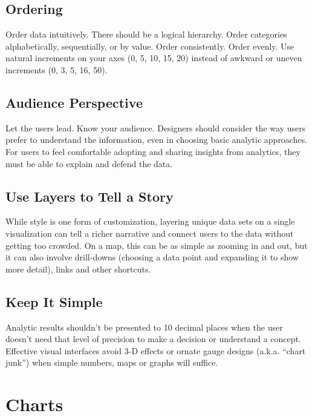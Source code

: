 \documentclass[]{book}
\begin{document}
\subsection{Ordering}\label{ordering}

Order data intuitively. There should be a logical hierarchy. Order
categories alphabetically, sequentially, or by value. Order
consistently. Order evenly. Use natural increments on your axes (0, 5,
10, 15, 20) instead of awkward or uneven increments (0, 3, 5, 16, 50).

\subsection{Audience Perspective}\label{audience-perspective}

Let the users lead. Know your audience. Designers should consider the
way users prefer to understand the information, even in choosing basic
analytic approaches. For users to feel comfortable adopting and sharing
insights from analytics, they must be able to explain and defend the
data.

\subsection{Use Layers to Tell a
Story}\label{use-layers-to-tell-a-story}

While style is one form of customization, layering unique data sets on a
single visualization can tell a richer narrative and connect users to
the data without getting too crowded. On a map, this can be as simple as
zooming in and out, but it can also involve drill-downs (choosing a data
point and expanding it to show more detail), links and other shortcuts.

\subsection{Keep It Simple}\label{keep-it-simple}

Analytic results shouldn't be presented to 10 decimal places when the
user doesn't need that level of precision to make a decision or
understand a concept. Effective visual interfaces avoid 3-D effects or
ornate gauge designs (a.k.a. ``chart junk'') when simple numbers, maps
or graphs will suffice.

\section{Charts}\label{charts}
\end{document}
